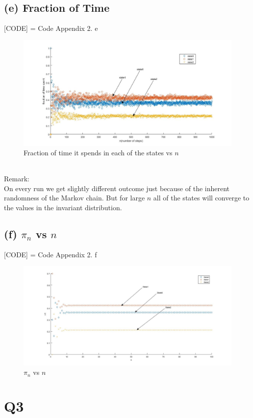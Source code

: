 \documentclass[a4paper,11pt]{report}
\begin{document}
\subsection*{(e) Fraction of Time}
[CODE] = Code Appendix 2. e 
\begin{figure}[h]
\hspace*{-6cm}
        \includegraphics[scale=0.6]{2e}
        \caption{Fraction of time it spends in each of the states  vs $ n$}
\end{figure}\\
Remark:\\
On every run we get slightly different outcome just because of the inherent randomness of the Markov chain.
But for large $n$ all of the states will converge to the values in the invariant distribution.
\newpage
\subsection*{(f) $\pi_n$  vs $n$}
[CODE] = Code Appendix 2. f 
\begin{figure}[htbp]
\hspace*{-6cm}
        \includegraphics[scale=0.5]{2f}
        \caption{$\pi_n$ vs $n$}
\end{figure}
\newpage 
\section*{Q3}
\end{document}
